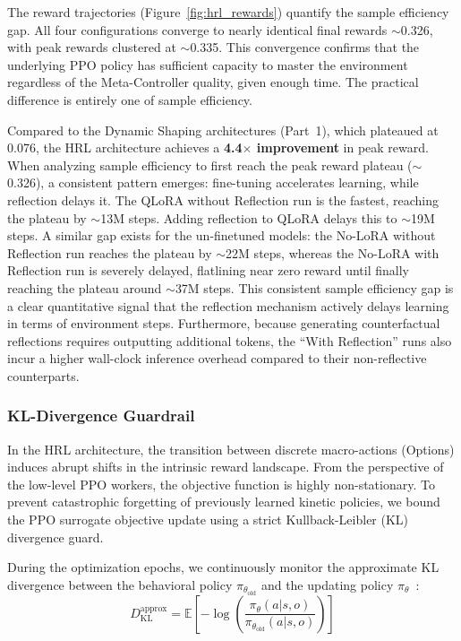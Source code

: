 The reward trajectories (Figure~\ref{fig:hrl_rewards}) quantify the sample efficiency gap. All four configurations converge to nearly identical final rewards $\sim$0.326, with peak rewards clustered at $\sim$0.335. This convergence confirms that the underlying PPO policy has sufficient capacity to master the environment regardless of the Meta-Controller quality, given enough time. The practical difference is entirely one of sample efficiency.

Compared to the Dynamic Shaping architectures (Part~1), which plateaued at 0.076, the HRL architecture achieves a \textbf{4.4$\times$ improvement} in peak reward. When analyzing sample efficiency to first reach the peak reward plateau ($\sim$0.326), a consistent pattern emerges: fine-tuning accelerates learning, while reflection delays it. The QLoRA without Reflection run is the fastest, reaching the plateau by $\sim$13M steps. Adding reflection to QLoRA delays this to $\sim$19M steps. A similar gap exists for the un-finetuned models: the No-LoRA without Reflection run reaches the plateau by $\sim$22M steps, whereas the No-LoRA with Reflection run is severely delayed, flatlining near zero reward until finally reaching the plateau around $\sim$37M steps. This consistent sample efficiency gap is a clear quantitative signal that the reflection mechanism actively delays learning in terms of environment steps. Furthermore, because generating counterfactual reflections requires outputting additional tokens, the ``With Reflection'' runs also incur a higher wall-clock inference overhead compared to their non-reflective counterparts.

\subsubsection{KL-Divergence Guardrail}
\label{sec:kl_guard}

In the HRL architecture, the transition between discrete macro-actions (Options) induces abrupt shifts in the intrinsic reward landscape. From the perspective of the low-level PPO workers, the objective function is highly non-stationary. To prevent catastrophic forgetting of previously learned kinetic policies, we bound the PPO surrogate objective update using a strict Kullback-Leibler (KL) divergence guard.

During the optimization epochs, we continuously monitor the approximate KL divergence between the behavioral policy $\pi_{\theta_{\text{old}}}$ and the updating policy $\pi_{\theta}$~\parencite{Schulman_Wolski_Dhariwal_Radford_Klimov_2017}:
\begin{equation}
    D_{\text{KL}}^{\text{approx}} = \mathbb{E}\left[ -\log \left( \frac{\pi_{\theta}(a|s, o)}{\pi_{\theta_{\text{old}}}(a|s, o)} \right) \right]
\end{equation}

